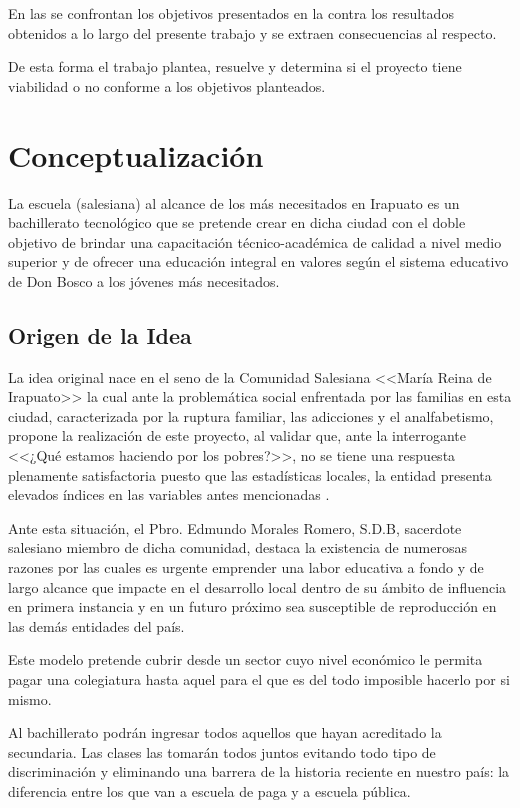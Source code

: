 En las \emph{} se confrontan los objetivos presentados en la  contra los resultados obtenidos a lo largo del presente trabajo y se extraen consecuencias al respecto.

De esta forma el trabajo plantea, resuelve y determina si el proyecto tiene viabilidad o no conforme a los objetivos planteados.

\section{Conceptualización}

La escuela (salesiana) al alcance de los más necesitados en Irapuato es un bachillerato tecnológico que se pretende crear en dicha ciudad con el doble objetivo de brindar una capacitación técnico-académica de calidad a nivel medio superior y de ofrecer una educación integral en valores según el sistema educativo de Don Bosco a los jóvenes más necesitados.

\subsection{Origen de la Idea}
\label{sub:intro:OrigenIdea}

La idea original nace en el seno de la Comunidad Salesiana <<María Reina de Irapuato>> la cual ante la problemática social enfrentada por las familias en esta ciudad, caracterizada por la ruptura familiar, las adicciones y el analfabetismo, propone la realización de este proyecto, al validar que, ante la interrogante <<¿Qué estamos haciendo por los pobres?>>, no se tiene una respuesta plenamente satisfactoria puesto que las estadísticas locales, la entidad presenta elevados índices en las variables antes mencionadas \citep{Morales09}.

Ante esta situación, el Pbro. Edmundo Morales Romero, S.D.B, sacerdote salesiano miembro de dicha comunidad, destaca la existencia de numerosas razones por las cuales es urgente emprender una labor educativa a fondo y de largo alcance que impacte en el desarrollo local dentro de su ámbito de influencia en primera instancia y en un futuro próximo sea susceptible de reproducción en las demás entidades del país.

Este modelo pretende cubrir desde un sector cuyo nivel económico le permita pagar una colegiatura hasta aquel para el que es del todo imposible hacerlo por si mismo.

Al bachillerato podrán ingresar todos aquellos que hayan acreditado la secundaria. Las clases las tomarán todos juntos evitando todo tipo de discriminación y eliminando una barrera de la historia reciente en nuestro país: la diferencia entre los que van a escuela de paga y a escuela pública.

